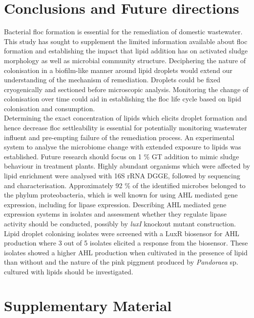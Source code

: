 \documentclass[11pt]{article}
\begin{document}
\section{Conclusions and Future directions}
Bacterial floc formation is essential for the remediation of domestic wastewater. This study has sought to supplement the limited information available about floc formation and establishing the impact that lipid addition has on activated sludge morphology as well as microbial community structure. Deciphering the nature of colonisation in a biofilm-like manner around lipid droplets would extend our understanding of the mechanism of remediation. Droplets could be fixed cryogenically and sectioned before microscopic analysis. Monitoring the change of colonisation over time could aid in establishing the floc life cycle based on lipid colonisation and consumption. \\


Determining the exact concentration of lipids which elicits droplet formation and hence decrease floc settleability is essential for potentially monitoring wastewater influent and pre-empting failure of the remediation process. An experimental system to analyse the microbiome change with extended exposure to lipids was established. Future research should focus on 1 \% GT addition to mimic sludge behaviour in treatment plants. Highly abundant organisms which were affected by lipid enrichment were analysed with 16S rRNA DGGE, followed by sequencing and characterisation. Approximately 92 \% of the identified microbes belonged to the phylum proteobacteria, which is well known for using AHL mediated gene expression, including for lipase expression. Describing AHL mediated gene expression systems in isolates and assessment whether they regulate lipase activity should be conducted, possibly by \emph{luxI} knockout mutant construction.\\

Lipid droplet colonising isolates were screened with a LuxR biosensor for AHL production where 3 out of 5 isolates elicited a response from the biosensor. These isolates showed a higher AHL production when cultivated in the presence of lipid than without and the nature of the pink piggment produced by \emph{Pandoraea} sp. cultured with lipids should be investigated.
\newpage 



\newpage 
\FloatBarrier
\section{Supplementary Material}
\end{document}
